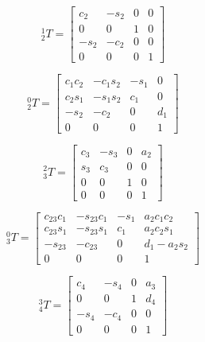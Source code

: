 \begin{equation} \label{eq:T21}
    {_2^{1}}T=\begin{bmatrix}
        c_2  & -s_2 & 0 & 0 \\
        0    & 0    & 1 & 0 \\
        -s_2 & -c_2 & 0 & 0 \\
        0    & 0    & 0 & 1
    \end{bmatrix}
\end{equation}

\begin{equation} \label{eq:T20}
    {_2^{0}}T=\begin{bmatrix}
        c_1c_2 & -c_1s_2 & -s_1 & 0   \\
        c_2s_1 & -s_1s_2 & c_1  & 0   \\
        -s_2   & -c_2    & 0    & d_1 \\
        0      & 0       & 0    & 1
    \end{bmatrix}
\end{equation}

\begin{equation} \label{eq:T32}
    {_3^{2}}T=\begin{bmatrix}
        c_3 & -s_3 & 0 & a_2 \\
        s_3 & c_3  & 0 & 0   \\
        0   & 0    & 1 & 0   \\
        0   & 0    & 0 & 1
    \end{bmatrix}
\end{equation}

\begin{equation} \label{eq:T30}
    {_3^{0}}T=\begin{bmatrix}
        c_{23}c_1 & -s_{23}c_1 & -s_1 & a_2c_1c_2  \\
        c_{23}s_1 & -s_{23}s_1 & c_1  & a_2c_2s_1  \\
        -s_{23}   & -c_{23}    & 0    & d_1-a_2s_2 \\
        0         & 0          & 0    & 1
    \end{bmatrix}
\end{equation}

\begin{equation} \label{eq:T43}
    {_4^{3}}T=\begin{bmatrix}
        c_4  & -s_4 & 0 & a_3 \\
        0    & 0    & 1 & d_4 \\
        -s_4 & -c_4 & 0 & 0   \\
        0    & 0    & 0 & 1
    \end{bmatrix}
\end{equation}

